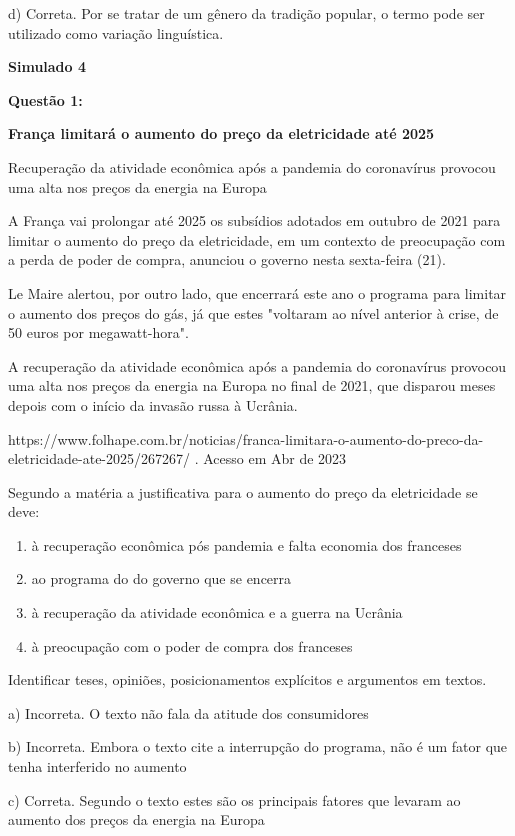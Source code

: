 d) Correta. Por se tratar de um gênero da tradição popular, o termo pode
ser utilizado como variação linguística.

\textbf{Simulado 4}

\textbf{Questão 1:}

\textbf{França limitará o aumento do preço da eletricidade até 2025}

Recuperação da atividade econômica após a pandemia do coronavírus
provocou uma alta nos preços da energia na Europa

A França vai prolongar até 2025 os subsídios adotados em outubro de 2021
para limitar o aumento do preço da eletricidade, em um contexto de
preocupação com a perda de poder de compra, anunciou o governo nesta
sexta-feira (21).

Le Maire alertou, por outro lado, que encerrará este ano o programa para
limitar o aumento dos preços do gás, já que estes "voltaram ao nível
anterior à crise, de 50 euros por megawatt-hora".

A recuperação da atividade econômica após a pandemia do coronavírus
provocou uma alta nos preços da energia na Europa no final de 2021, que
disparou meses depois com o início da invasão russa à Ucrânia.

https://www.folhape.com.br/noticias/franca-limitara-o-aumento-do-preco-da-eletricidade-ate-2025/267267/
. Acesso em Abr de 2023

Segundo a matéria a justificativa para o aumento do preço da
eletricidade se deve:

\begin{enumerate}
\def\labelenumi{\alph{enumi})}
\item
  à recuperação econômica pós pandemia e falta economia dos franceses
\item
  ao programa do do governo que se encerra
\item
  à recuperação da atividade econômica e a guerra na Ucrânia
\item
  à preocupação com o poder de compra dos franceses
\end{enumerate}

Identificar teses, opiniões, posicionamentos explícitos e argumentos em
textos.

a) Incorreta. O texto não fala da atitude dos consumidores

b) Incorreta. Embora o texto cite a interrupção do programa, não é um
fator que tenha interferido no aumento

c) Correta. Segundo o texto estes são os principais fatores que levaram
ao aumento dos preços da energia na Europa

